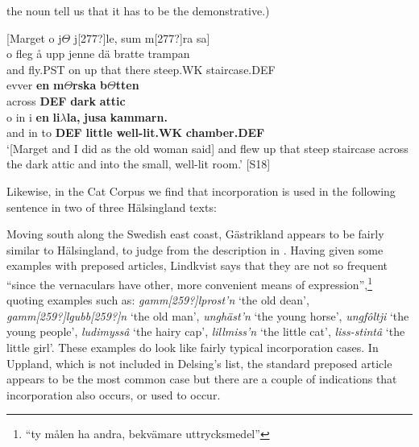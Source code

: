 the noun tell us that it has to be the demonstrative.) 

\ea\label{}
{}[Marget o j$\Theta $ j[277?]le, sum m[277?]ra sa]\\
\gll o  fleg  å  upp  jenne  dä  bratte  trampan\\
and  fly.PST  on  up  that  there  steep.WK  staircase.DEF\\
\gll evver  \textbf{en} \textbf{m}\textbf{$\Theta $}\textbf{rska} \textbf{b}\textbf{$\Theta $}\textbf{tten}\\
across  \textbf{DEF} \textbf{dark} \textbf{attic}\\
\gll o  in  i  \textbf{en}\textbf{  li}\textbf{$\lambda $}\textbf{la,}\textbf{  jusa}\textbf{  kammarn.}\\
and  in  to   \textbf{DEF} \textbf{little} \textbf{well-lit.WK} \textbf{chamber.DEF}\\
\glt ‘[Marget and I did as the old woman said] and flew up that steep staircase across the dark attic and into the small, well-lit room.’ [S18]
\z

Likewise, in the Cat Corpus we find that incorporation is used in the following sentence in two of three Hälsingland texts:

\ea
{}
\z 
\z 

Moving south along the Swedish east coast, Gästrikland appears to be fairly similar to Hälsingland, to judge from the description in \citet[79]{Lindkvist1942}.  Having given some examples with preposed articles, Lindkvist says that they are not so frequent “since the vernaculars have other, more convenient means of expression”,\footnote{ “ty målen ha andra, bekvämare uttrycksmedel”} quoting examples such as: \textit{gamm[259?]lprost’n} ‘the old dean’, \textit{gamm[259?]lgubb[259?]n} ‘the old man’, \textit{unghäst’n} ‘the young horse’, \textit{ungfôltji} ‘the young people’, \textit{ludimyssâ} ‘the hairy cap’, \textit{lillmiss’n} ‘the little cat’, \textit{liss-stintâ} ‘the little girl’. These examples do look like fairly typical incorporation cases.  In Uppland, which is not included in Delsing’s list, the standard preposed article appears to be the most common case but there are a couple of indications that incorporation also occurs, or used to occur.

